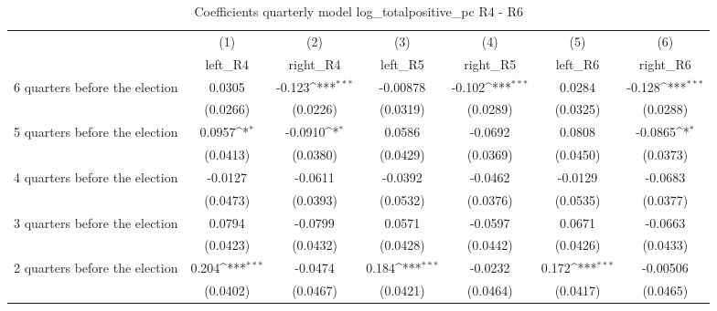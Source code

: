 \begin{table}[htbp]\centering
\def\sym#1{\ifmmode^{#1}\else\(^{#1}\)\fi}
\caption{Coefficients quarterly model log\_totalpositive\_pc R4 - R6}
\begin{tabular}{l*{6}{c}}
\hline\hline
                    &\multicolumn{1}{c}{(1)}&\multicolumn{1}{c}{(2)}&\multicolumn{1}{c}{(3)}&\multicolumn{1}{c}{(4)}&\multicolumn{1}{c}{(5)}&\multicolumn{1}{c}{(6)}\\
                    &\multicolumn{1}{c}{left\_R4}&\multicolumn{1}{c}{right\_R4}&\multicolumn{1}{c}{left\_R5}&\multicolumn{1}{c}{right\_R5}&\multicolumn{1}{c}{left\_R6}&\multicolumn{1}{c}{right\_R6}\\
\hline
 6 quarters before the election&      0.0305         &      -0.123\sym{***}&    -0.00878         &      -0.102\sym{***}&      0.0284         &      -0.128\sym{***}\\
                    &    (0.0266)         &    (0.0226)         &    (0.0319)         &    (0.0289)         &    (0.0325)         &    (0.0288)         \\
[1em]
 5 quarters before the election&      0.0957\sym{*}  &     -0.0910\sym{*}  &      0.0586         &     -0.0692         &      0.0808         &     -0.0865\sym{*}  \\
                    &    (0.0413)         &    (0.0380)         &    (0.0429)         &    (0.0369)         &    (0.0450)         &    (0.0373)         \\
[1em]
 4 quarters before the election&     -0.0127         &     -0.0611         &     -0.0392         &     -0.0462         &     -0.0129         &     -0.0683         \\
                    &    (0.0473)         &    (0.0393)         &    (0.0532)         &    (0.0376)         &    (0.0535)         &    (0.0377)         \\
[1em]
 3 quarters before the election&      0.0794         &     -0.0799         &      0.0571         &     -0.0597         &      0.0671         &     -0.0663         \\
                    &    (0.0423)         &    (0.0432)         &    (0.0428)         &    (0.0442)         &    (0.0426)         &    (0.0433)         \\
[1em]
 2 quarters before the election&       0.204\sym{***}&     -0.0474         &       0.184\sym{***}&     -0.0232         &       0.172\sym{***}&    -0.00506         \\
                    &    (0.0402)         &    (0.0467)         &    (0.0421)         &    (0.0464)         &    (0.0417)         &    (0.0465)         \\

\end{tabular}
\end{table}
